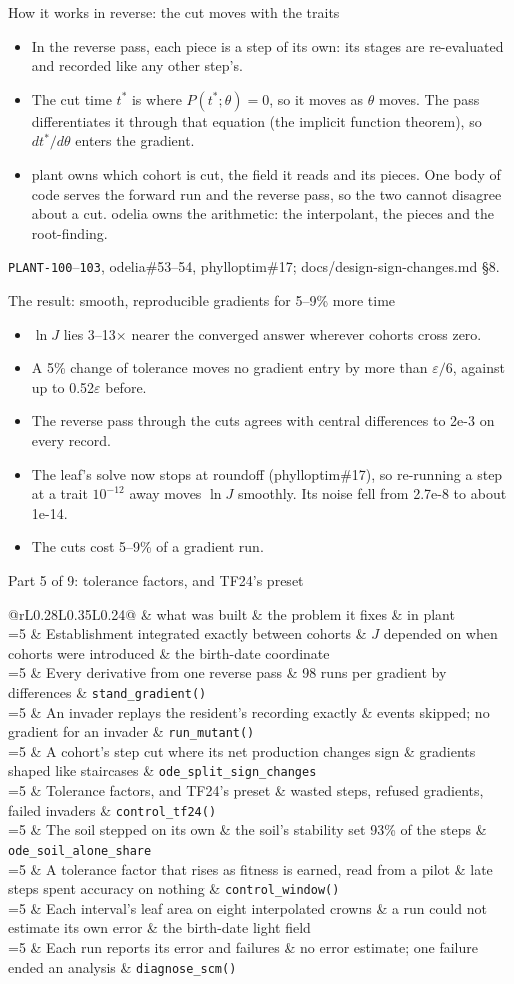 \documentclass[aspectratio=169,10pt]{beamer}
\makeatletter
\newcommand{\src}[1]{\par\vfill{\tiny\color{quiet} #1}}
\newcommand{\rmrow}[4]{%
  \ifnum#1=\rmcurrent \rowcolor{wash}\fi
  #1 & #2 & #3 & #4 \\}
\newcommand{\roadmap}[1]{%
  \def\rmcurrent{#1}%
  \footnotesize
  \begin{tabular}{@{}rL{0.28\textwidth}L{0.35\textwidth}L{0.24\textwidth}@{}}
    \toprule
    & what was built & the problem it fixes & in plant \\
    \midrule
    \rmrow{1}{Establishment integrated exactly between cohorts}{$J$ depended on when cohorts were introduced}{the birth-date coordinate}
    \rmrow{2}{Every derivative from one reverse pass}{98 runs per gradient by differences}{\texttt{stand\_gradient()}}
    \rmrow{3}{An invader replays the resident's recording exactly}{events skipped; no gradient for an invader}{\texttt{run\_mutant()}}
    \rmrow{4}{A cohort's step cut where its net production changes sign}{gradients shaped like staircases}{\texttt{ode\_split\_sign\_changes}}
    \rmrow{5}{Tolerance factors, and TF24's preset}{wasted steps, refused gradients, failed invaders}{\texttt{control\_tf24()}}
    \rmrow{6}{The soil stepped on its own}{the soil's stability set 93\% of the steps}{\texttt{ode\_soil\_alone\_share}}
    \rmrow{7}{A tolerance factor that rises as fitness is earned, read from a pilot}{late steps spent accuracy on nothing}{\texttt{control\_window()}}
    \rmrow{8}{Each interval's leaf area on eight interpolated crowns}{a run could not estimate its own error}{the birth-date light field}
    \rmrow{9}{Each run reports its error and failures}{no error estimate; one failure ended an analysis}{\texttt{diagnose\_scm()}}
    \bottomrule
  \end{tabular}}
\makeatother
\begin{document}
\begin{frame}{How it works in reverse: the cut moves with the traits}
  \small
  \begin{itemize}
    \item In the reverse pass, each piece is a step of its own: its stages are re-evaluated and
      recorded like any other step's.
    \item The cut time $t^*$ is where $P(t^*; \theta) = 0$, so it moves as $\theta$ moves. The
      pass differentiates it through that equation (the implicit function theorem), so
      $dt^*/d\theta$ enters the gradient.
    \item plant owns which cohort is cut, the field it reads and its pieces. One body of code
      serves the forward run and the reverse pass, so the two cannot disagree about a cut.
      odelia owns the arithmetic: the interpolant, the pieces and the root-finding.
  \end{itemize}
  \src{\texttt{PLANT-100}--\texttt{103}, odelia\#53--54, phylloptim\#17; docs/design-sign-changes.md \S8.}
\end{frame}

\begin{frame}{The result: smooth, reproducible gradients for 5--9\% more time}
  \small
  \begin{itemize}
    \item $\ln J$ lies 3--13$\times$ nearer the converged answer wherever cohorts cross zero.
    \item A 5\% change of tolerance moves no gradient entry by more than $\varepsilon/6$, against
      up to 0.52$\varepsilon$ before.
    \item The reverse pass through the cuts agrees with central differences to 2e-3 on every
      record.
    \item The leaf's solve now stops at roundoff (phylloptim\#17), so re-running a step at a
      trait $10^{-12}$ away moves $\ln J$ smoothly. Its noise fell from 2.7e-8 to about 1e-14.
    \item The cuts cost 5--9\% of a gradient run.
  \end{itemize}
\end{frame}

\begin{frame}{Part 5 of 9: tolerance factors, and TF24's preset}
  \roadmap{5}
\end{frame}
\end{document}

